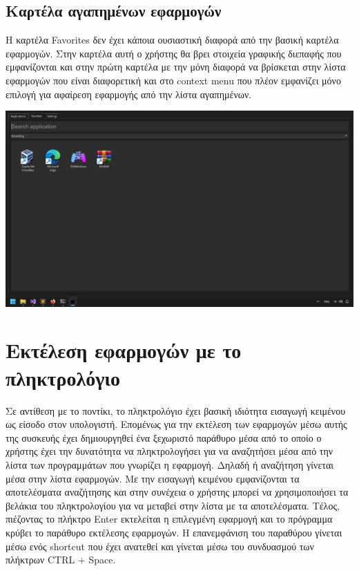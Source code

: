 \subsection{Καρτέλα αγαπημένων εφαρμογών}

Η καρτέλα Favorites δεν έχει κάποια ουσιαστική διαφορά από την βασική καρτέλα εφαρμογών. Στην 
καρτέλα αυτή ο χρήστης θα βρει στοιχεία γραφικής διεπαφής που εμφανίζονται και στην πρώτη καρτέλα
με την μόνη διαφορά να βρίσκεται στην λίστα εφαρμογών που είναι διαφορετική και στο context menu
που πλέον εμφανίζει μόνο επιλογή για αφαίρεση εφαρμογής από την λίστα αγαπημένων.

\includegraphics[width=1.0\textwidth]{./images/tab_favorites.png}

\section{Εκτέλεση εφαρμογών με το πληκτρολόγιο}

Σε αντίθεση με το ποντίκι, το πληκτρολόγιο έχει βασική ιδιότητα εισαγωγή κειμένου ως είσοδο στον
υπολογιστή. Επομένως για την εκτέλεση των εφαρμογών μέσω αυτής της συσκευής έχει δημιουργηθεί 
ένα ξεχωριστό παράθυρο μέσα από το οποίο ο χρήστης έχει την δυνατότητα να πληκτρολογήσει για
να αναζητήσει μέσα από την λίστα των προγραμμάτων που γνωρίζει η εφαρμογή. Δηλαδή ή αναζήτηση
γίνεται μέσα στην λίστα εφαρμογών. Με την εισαγωγή κειμένου εμφανίζονται τα αποτελέσματα
αναζήτησης και στην συνέχεια ο χρήστης μπορεί να χρησιμοποιήσει τα βελάκια του πληκτρολογίου
για να μεταβεί στην λίστα με τα αποτελέσματα. Τέλος, πιέζοντας το πλήκτρο Enter εκτελείται η
επιλεγμένη εφαρμογή και το πρόγραμμα κρύβει το παράθυρο εκτέλεσης εφαρμογών. Η επανεμφάνιση του
παραθύρου γίνεται μέσω ενός shortcut που έχει ανατεθεί και γίνεται μέσω του συνδυασμού των πλήκτρων
CTRL + Space. 


